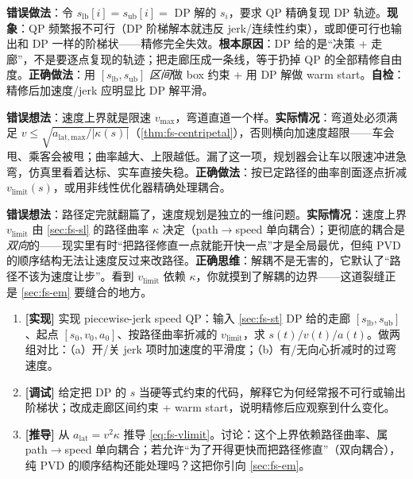 \begin{pitfall}
\textbf{错误做法}：令 $s_{\mathrm{lb}}[i]=s_{\mathrm{ub}}[i]=$ DP 解的 $s_i$，要求 QP 精确复现 DP 轨迹。\textbf{现象}：QP 频繁报不可行（DP 阶梯解本就违反 jerk/连续性约束），或即便可行也输出和 DP 一样的阶梯状——精修完全失效。\textbf{根本原因}：DP 给的是“决策 + 走廊”，不是要逐点复现的轨迹；把走廊压成一条线，等于扔掉 QP 的全部精修自由度。\textbf{正确做法}：用 $[s_{\mathrm{lb}},s_{\mathrm{ub}}]$ \emph{区间}做 box 约束 + 用 DP 解做 warm start。\textbf{自检}：精修后加速度/jerk 应明显比 DP 解平滑。
\end{pitfall}

\begin{pitfall}
\textbf{错误想法}：速度上界就是限速 $v_{\max}$，弯道直道一个样。\textbf{实际情况}：弯道处必须满足 $v\le\sqrt{a_{\mathrm{lat,max}}/|\kappa(s)|}$（\cref{thm:fs-centripetal}），否则横向加速度超限——车会甩、乘客会被甩；曲率越大、上限越低。漏了这一项，规划器会让车以限速冲进急弯，仿真里看着达标、实车直接失稳。\textbf{正确做法}：按已定路径的曲率剖面逐点折减 $v_{\mathrm{limit}}(s)$，或用非线性优化器精确处理耦合。
\end{pitfall}

\begin{pitfall}
\textbf{错误想法}：路径定完就翻篇了，速度规划是独立的一维问题。\textbf{实际情况}：速度上界 $v_{\mathrm{limit}}$ 由 \cref{sec:fs-sl} 的路径曲率 $\kappa$ 决定（path$\to$speed 单向耦合）；更彻底的耦合是\emph{双向}的——现实里有时“把路径修直一点就能开快一点”才是全局最优，但纯 PVD 的顺序结构无法让速度反过来改路径。\textbf{正确思维}：解耦不是无害的，它默认了“路径不该为速度让步”。看到 $v_{\mathrm{limit}}$ 依赖 $\kappa$，你就摸到了解耦的边界——这道裂缝正是 \cref{sec:fs-em} 要缝合的地方。
\end{pitfall}

\begin{practice}
\begin{enumerate}
  \item \textbf{[实现]} 实现 piecewise-jerk speed QP：输入 \cref{sec:fs-st} DP 给的走廊 $[s_{\mathrm{lb}},s_{\mathrm{ub}}]$、起点 $[s_0,v_0,a_0]$、按路径曲率折减的 $v_{\mathrm{limit}}$，求 $s(t)/v(t)/a(t)$。做两组对比：（a）开/关 jerk 项时加速度的平滑度；（b）有/无向心折减时的过弯速度。
  \item \textbf{[调试]} 给定把 DP 的 $s$ 当硬等式约束的代码，解释它为何经常报不可行或输出阶梯状；改成走廊区间约束 + warm start，说明精修后应观察到什么变化。
  \item \textbf{[推导]} 从 $a_{\mathrm{lat}}=v^2\kappa$ 推导 \cref{eq:fs-vlimit}。讨论：这个上界依赖路径曲率、属 path$\to$speed 单向耦合；若允许“为了开得更快而把路径修直”（双向耦合），纯 PVD 的顺序结构还能处理吗？这把你引向 \cref{sec:fs-em}。
\end{enumerate}
\end{practice}

